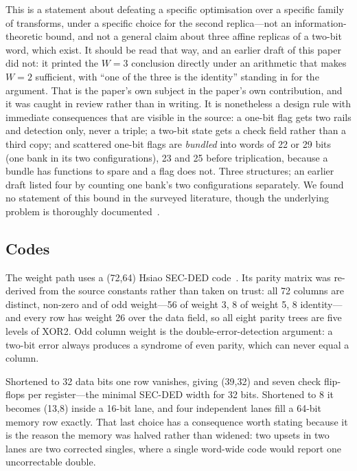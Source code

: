 \documentclass[11pt,a4paper]{article}
\begin{document}
This is a statement about defeating a specific optimisation over a
specific family of transforms, under a specific choice for the second
replica---not an information-theoretic bound, and not a general claim
about three affine replicas of a two-bit word, which exist. It should be
read that way, and an earlier draft of this paper did not: it printed the
$W=3$ conclusion directly under an arithmetic that makes $W=2$
sufficient, with ``one of the three is the identity'' standing in for the
argument. That is the paper's own subject in the paper's own contribution,
and it was caught in review rather than in writing. It is nonetheless a design rule with immediate
consequences that are visible in the source: a one-bit flag gets two
rails and detection only, never a triple; a two-bit state gets a check
field rather than a third copy; and scattered one-bit flags are
\emph{bundled} into words of 22 or 29 bits (one bank in its two
configurations), 23 and 25 before triplication, because a bundle has
functions to spare and a flag does not. Three structures; an earlier
draft listed four by counting one bank's two configurations separately.
We found no statement of this bound in the surveyed literature, though
the underlying problem is thoroughly documented~\cite{kastensmidt2005,
esa_ftmr,tmrg2017}.

\subsection{Codes}

The weight path uses a (72,64) Hsiao SEC-DED code~\cite{hsiao1970}. Its
parity matrix was re-derived from the source constants rather than taken
on trust: all 72 columns are distinct, non-zero and of odd weight---56 of
weight 3, 8 of weight 5, 8 identity---and every row has weight 26 over
the data field, so all eight parity trees are five levels of XOR2. Odd
column weight is the double-error-detection argument: a two-bit error
always produces a syndrome of even parity, which can never equal a
column.

Shortened to 32 data bits one row vanishes, giving (39,32) and seven
check flip-flops per register---the minimal SEC-DED width for 32 bits.
Shortened to 8 it becomes (13,8) inside a 16-bit lane, and four
independent lanes fill a 64-bit memory row exactly. That last choice has
a consequence worth stating because it is the reason the memory was
halved rather than widened: two upsets in two lanes are two corrected
singles, where a single word-wide code would report one uncorrectable
double.
\end{document}
